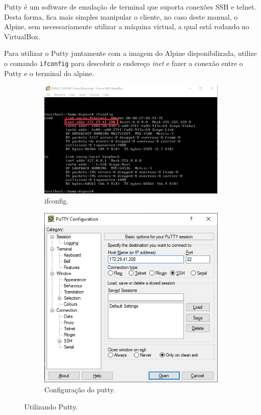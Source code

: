 Putty é um software de emulação de terminal que suporta conexões SSH e telnet. Desta forma, fica mais simples manipular o cliente, no caso deste manual, o Alpine, sem necessariamente utilizar a máquina virtual, a qual está rodando no VirtualBox.

Para utilizar o Putty juntamente com a imagem do Alpine disponibilizada, utilize o comando \lstinline{ifconfig} para descobrir o endereço \textit{inet} e fazer a conexão entre o Putty e o terminal do alpine.

 \begin{figure}[H]
 
     \begin{subfigure}{0.6\textwidth}
     \includegraphics[width=0.9\linewidth]{../images/putty2.png} 
     \caption{ifconfig.}
     \end{subfigure}
     \begin{subfigure}{0.4\textwidth}
     \includegraphics[width=0.9\linewidth]{../images/putty3.png}
     \caption{Configuração do putty.}
     \end{subfigure}
 
 \caption{Utilizando Putty.}
 \end{figure}

